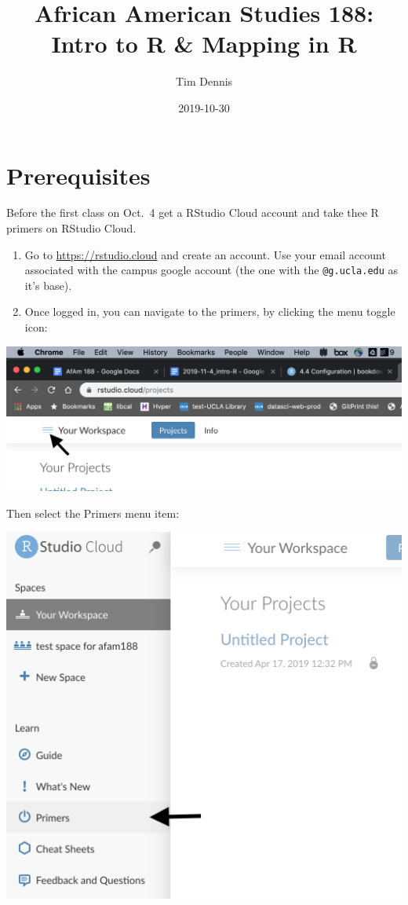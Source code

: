 \documentclass[]{book}
\title{African American Studies 188: Intro to R \& Mapping in R}
\author{Tim Dennis}
\date{2019-10-30}
\begin{document}
\maketitle

{
\setcounter{tocdepth}{1}
\tableofcontents
}
\hypertarget{prerequisites}{%
\chapter{Prerequisites}\label{prerequisites}}

Before the first class on Oct.~4 get a RStudio Cloud account and take thee R primers on RStudio Cloud.

\begin{enumerate}
\def\labelenumi{\arabic{enumi}.}
\item
  Go to \url{https://rstudio.cloud} and create an account. Use your email account associated with the campus google account (the one with the \texttt{@g.ucla.edu} as it's base).
\item
  Once logged in, you can navigate to the primers, by clicking the menu toggle icon:
\end{enumerate}

\includegraphics[width=400pt]{images/rstudio-cloud}

Then select the Primers menu item:

\includegraphics[width=400pt]{images/primers}
\end{document}

